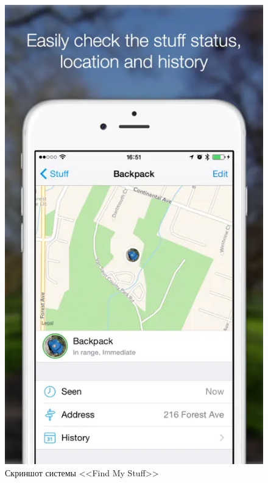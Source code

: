 \documentclass{../mirea}
\begin{document}
	\begin{figure}[htb]
		\centering
		\includegraphics[height=.4\textheight]{../images/findMyStuff1.png}
		\parskip=6pt
		\caption{Скриншот системы <<Find My Stuff>>}
		\label{fig:findMyStuff1}
	\end{figure}
	
\end{document}
